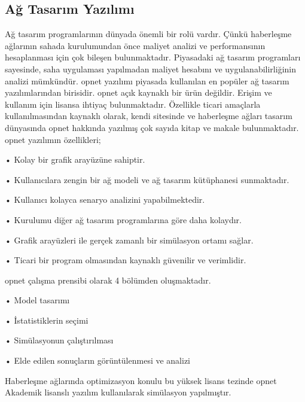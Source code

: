 \subsection{Ağ Tasarım Yazılımı}

Ağ tasarım programlarının dünyada önemli bir rolü vardır. Çünkü haberleşme ağlarının sahada kurulumundan önce maliyet analizi ve performansının hesaplanması için çok bileşen bulunmaktadır. Piyasadaki ağ tasarım programları sayesinde, saha uygulaması yapılmadan maliyet hesabını ve uygulanabilirliğinin analizi mümkündür. \gls{opnet} yazılımı piyasada kullanılan en popüler ağ tasarım yazılımlarından birisidir. \gls{opnet} açık kaynaklı bir ürün değildir. Erişim ve kullanım için lisansa ihtiyaç bulunmaktadır. Özellikle ticari amaçlarla kullanılmasından kaynaklı olarak, kendi sitesinde ve haberleşme ağları tasarım dünyasında \gls{opnet} hakkında yazılmış çok sayıda kitap ve makale bulunmaktadır. \gls{opnet} yazılımın özellikleri;

•	Kolay bir grafik arayüzüne sahiptir.

•	Kullanıcılara zengin bir ağ modeli ve ağ tasarım kütüphanesi sunmaktadır.

•	Kullanıcı kolayca senaryo analizini yapabilmektedir.

•	Kurulumu diğer ağ tasarım programlarına göre daha kolaydır.

•	Grafik arayüzleri ile gerçek zamanlı bir simülasyon ortamı sağlar.

•	Ticari bir program olmasından kaynaklı güvenilir ve verimlidir.


\gls{opnet} çalışma prensibi olarak 4 bölümden oluşmaktadır. 

•	Model tasarımı

•	İstatistiklerin seçimi

•	Simülasyonun çalıştırılması

•	Elde edilen sonuçların görüntülenmesi ve analizi


Haberleşme ağlarında optimizasyon konulu bu yüksek lisans tezinde \gls{opnet} Akademik lisanslı yazılım kullanılarak simülasyon yapılmıştır. \cite{FITPUB8317}